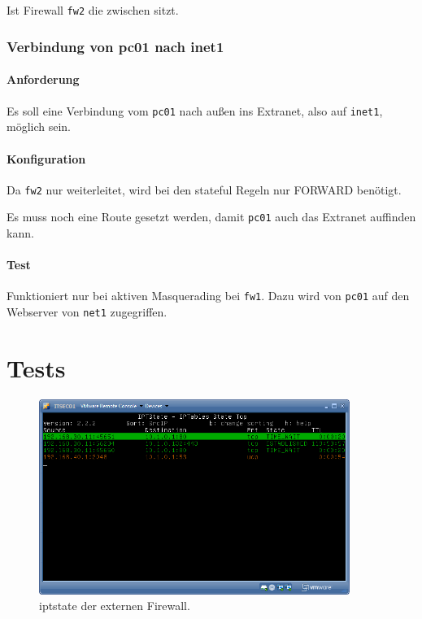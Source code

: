 \subsection{\fwb}

Ist Firewall {\tt fw2} die zwischen \fwb sitzt.

\subsubsection{Verbindung von pc01 nach inet1}

\paragraph{Anforderung} Es soll eine Verbindung vom {\tt pc01} nach
außen ins Extranet, also auf {\tt inet1}, möglich sein.


\paragraph{Konfiguration}

Da {\tt fw2} nur weiterleitet, wird bei den stateful
Regeln nur FORWARD benötigt.

Es muss noch eine Route gesetzt werden, damit {\tt pc01} auch das Extranet
auffinden kann.

\paragraph{Test} Funktioniert nur bei aktiven Masquerading bei {\tt fw1}.
Dazu wird von {\tt pc01} auf den Webserver von {\tt net1} zugegriffen.


\section{Tests}\label{sec.tests}

\begin{figure}[h!]
  \centering
    \includegraphics[width=0.9\textwidth]{figures/iptstate-extern.png}
  \caption{iptstate der externen Firewall.}
  \label{fig.iptstate-extern}
\end{figure}

